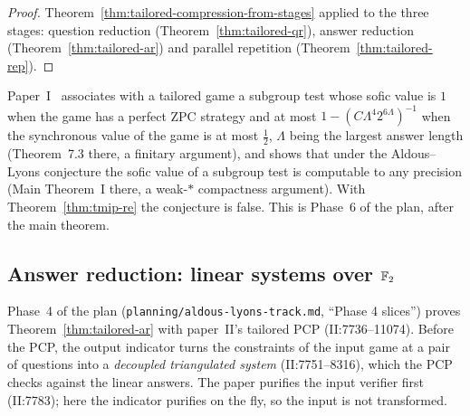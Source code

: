 \begin{proof}
\leanok
Theorem~\ref{thm:tailored-compression-from-stages} applied to the three stages: question
reduction (Theorem~\ref{thm:tailored-qr}), answer reduction (Theorem~\ref{thm:tailored-ar}) and
parallel repetition (Theorem~\ref{thm:tailored-rep}).
\end{proof}

\begin{remark}
\label{rem:tailored-al}
Paper~I~\cite{BCLV24} associates with a tailored game a subgroup test whose sofic value is $1$
when the game has a perfect ZPC strategy and at most $1 - (C\Lambda^4 2^{6\Lambda})^{-1}$ when the
synchronous value of the game is at most $\frac12$, $\Lambda$ being the largest answer length
(Theorem~7.3 there, a finitary argument), and shows that under the Aldous--Lyons conjecture the
sofic value of a subgroup test is computable to any precision (Main Theorem~I there, a weak-$*$
compactness argument). With Theorem~\ref{thm:tmip-re} the conjecture is false. This is Phase~6
of the plan, after the main theorem.
\end{remark}

\subsection{Answer reduction: linear systems over $\mathbb{F}_2$}

Phase~4 of the plan (\texttt{planning/aldous-lyons-track.md}, ``Phase 4 slices'') proves
Theorem~\ref{thm:tailored-ar} with paper~II's tailored PCP (II:7736--11074). Before the PCP, the
output indicator turns the constraints of the input game at a pair of questions into a
\emph{decoupled triangulated system} (II:7751--8316), which the PCP checks against the linear
answers. The paper purifies the input verifier first (II:7783); here the indicator purifies on
the fly, so the input is not transformed.

